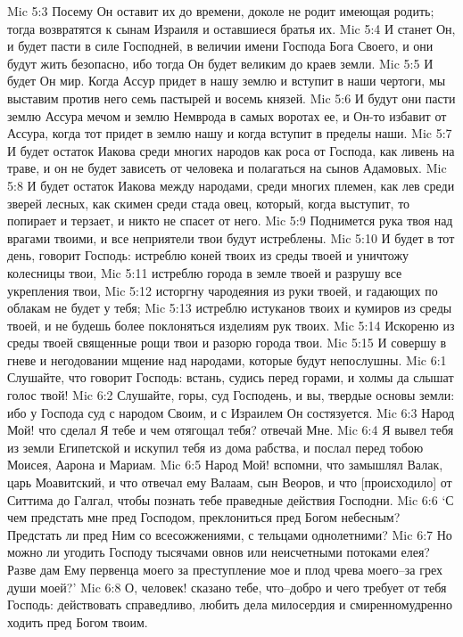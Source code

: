 Mic 5:3  Посему Он оставит их до времени, доколе не родит имеющая родить; тогда возвратятся к сынам Израиля и оставшиеся братья их.
Mic 5:4  И станет Он, и будет пасти в силе Господней, в величии имени Господа Бога Своего, и они будут жить безопасно, ибо тогда Он будет великим до краев земли.
Mic 5:5  И будет Он мир. Когда Ассур придет в нашу землю и вступит в наши чертоги, мы выставим против него семь пастырей и восемь князей.
Mic 5:6  И будут они пасти землю Ассура мечом и землю Немврода в самых воротах ее, и Он-то избавит от Ассура, когда тот придет в землю нашу и когда вступит в пределы наши.
Mic 5:7  И будет остаток Иакова среди многих народов как роса от Господа, как ливень на траве, и он не будет зависеть от человека и полагаться на сынов Адамовых.
Mic 5:8  И будет остаток Иакова между народами, среди многих племен, как лев среди зверей лесных, как скимен среди стада овец, который, когда выступит, то попирает и терзает, и никто не спасет от него.
Mic 5:9  Поднимется рука твоя над врагами твоими, и все неприятели твои будут истреблены.
Mic 5:10  И будет в тот день, говорит Господь: истреблю коней твоих из среды твоей и уничтожу колесницы твои,
Mic 5:11  истреблю города в земле твоей и разрушу все укрепления твои,
Mic 5:12  исторгну чародеяния из руки твоей, и гадающих по облакам не будет у тебя;
Mic 5:13  истреблю истуканов твоих и кумиров из среды твоей, и не будешь более поклоняться изделиям рук твоих.
Mic 5:14  Искореню из среды твоей священные рощи твои и разорю города твои.
Mic 5:15  И совершу в гневе и негодовании мщение над народами, которые будут непослушны.
Mic 6:1  Слушайте, что говорит Господь: встань, судись перед горами, и холмы да слышат голос твой!
Mic 6:2  Слушайте, горы, суд Господень, и вы, твердые основы земли: ибо у Господа суд с народом Своим, и с Израилем Он состязуется.
Mic 6:3  Народ Мой! что сделал Я тебе и чем отягощал тебя? отвечай Мне.
Mic 6:4  Я вывел тебя из земли Египетской и искупил тебя из дома рабства, и послал перед тобою Моисея, Аарона и Мариам.
Mic 6:5  Народ Мой! вспомни, что замышлял Валак, царь Моавитский, и что отвечал ему Валаам, сын Веоров, и что [происходило] от Ситтима до Галгал, чтобы познать тебе праведные действия Господни.
Mic 6:6  `С чем предстать мне пред Господом, преклониться пред Богом небесным? Предстать ли пред Ним со всесожжениями, с тельцами однолетними?
Mic 6:7  Но можно ли угодить Господу тысячами овнов или неисчетными потоками елея? Разве дам Ему первенца моего за преступление мое и плод чрева моего--за грех души моей?'
Mic 6:8  О, человек! сказано тебе, что--добро и чего требует от тебя Господь: действовать справедливо, любить дела милосердия и смиренномудренно ходить пред Богом твоим.
